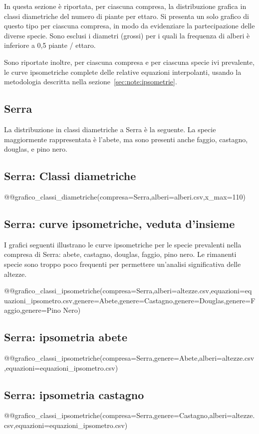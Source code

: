 In questa sezione è riportata, per ciascuna compresa, la distribuzione grafica in classi diametriche del numero di piante per ettaro. Si presenta un solo grafico di questo tipo per ciascuna compresa, in modo da evidenziare la partecipazione delle diverse specie. Sono esclusi i diametri (grossi) per i quali la frequenza di alberi è inferiore a 0,5 piante / ettaro.

Sono riportate inoltre, per ciascuna compresa e per ciascuna specie ivi prevalente, le curve ipsometriche complete delle relative equazioni interpolanti, usando la metodologia descritta nella sezione~\ref{sec:note:ipsometrie}.

\clearpage
\subsection{Serra}

La distribuzione in classi diametriche a Serra è la seguente. La specie maggiormente rappresentata è l'abete, ma sono presenti anche faggio, castagno, douglas, e pino nero.

\subsection*{Serra: Classi diametriche}
@@grafico_classi_diametriche(compresa=Serra,alberi=alberi.csv,x_max=110)

\subsection*{Serra: curve ipsometriche, veduta d'insieme}

I grafici seguenti illustrano le curve ipsometriche per le specie prevalenti nella compresa di Serra: abete, castagno, douglas, faggio, pino nero. Le rimanenti specie sono troppo poco frequenti per permettere un'analisi significativa delle altezze.

@@grafico_classi_ipsometriche(compresa=Serra,alberi=altezze.csv,equazioni=equazioni_ipsometro.csv,genere=Abete,genere=Castagno,genere=Douglas,genere=Faggio,genere=Pino Nero)
\clearpage

\subsection*{Serra: ipsometria abete}
@@grafico_classi_ipsometriche(compresa=Serra,genere=Abete,alberi=altezze.csv,equazioni=equazioni_ipsometro.csv)

\subsection*{Serra: ipsometria castagno}
@@grafico_classi_ipsometriche(compresa=Serra,genere=Castagno,alberi=altezze.csv,equazioni=equazioni_ipsometro.csv)
\clearpage

